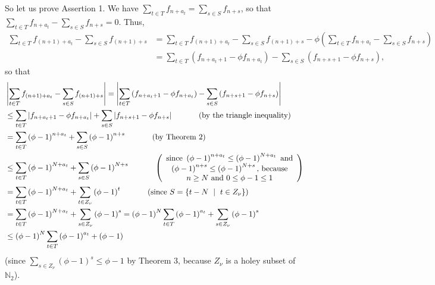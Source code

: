 \documentclass[12pt,final,notitlepage,onecolumn]{article}%
\begin{document}
So let us prove Assertion 1. We have $\sum\limits_{t\in T}f_{n+a_{t}}%
=\sum\limits_{s\in S}f_{n+s}$, so that $\sum\limits_{t\in T}f_{n+a_{t}}%
-\sum\limits_{s\in S}f_{n+s}=0$. Thus,%
\begin{align*}
\sum\limits_{t\in T}f_{\left(  n+1\right)  +a_{t}}-\sum\limits_{s\in
S}f_{\left(  n+1\right)  +s}  &  =\sum\limits_{t\in T}f_{\left(  n+1\right)
+a_{t}}-\sum\limits_{s\in S}f_{\left(  n+1\right)  +s}-\phi\left(
\sum\limits_{t\in T}f_{n+a_{t}}-\sum\limits_{s\in S}f_{n+s}\right) \\
&  =\sum\limits_{t\in T}\left(  f_{n+a_{t}+1}-\phi f_{n+a_{t}}\right)
-\sum\limits_{s\in S}\left(  f_{n+s+1}-\phi f_{n+s}\right)  ,
\end{align*}
so that%
\begin{align}
&  \left\vert \sum\limits_{t\in T}f_{\left(  n+1\right)  +a_{t}}%
-\sum\limits_{s\in S}f_{\left(  n+1\right)  +s}\right\vert =\left\vert
\sum\limits_{t\in T}\left(  f_{n+a_{t}+1}-\phi f_{n+a_{t}}\right)
-\sum\limits_{s\in S}\left(  f_{n+s+1}-\phi f_{n+s}\right)  \right\vert
\nonumber\\
&  \leq\sum\limits_{t\in T}\left\vert f_{n+a_{t}+1}-\phi f_{n+a_{t}%
}\right\vert +\sum\limits_{s\in S}\left\vert f_{n+s+1}-\phi f_{n+s}\right\vert
\ \ \ \ \ \ \ \ \ \ \left(  \text{by the triangle inequality}\right)
\nonumber\\
&  =\sum\limits_{t\in T}\left(  \phi-1\right)  ^{n+a_{t}}+\sum\limits_{s\in
S}\left(  \phi-1\right)  ^{n+s}\ \ \ \ \ \ \ \ \ \ \left(  \text{by Theorem
2}\right) \nonumber\\
&  \leq\sum\limits_{t\in T}\left(  \phi-1\right)  ^{N+a_{t}}+\sum\limits_{s\in
S}\left(  \phi-1\right)  ^{N+s}\ \ \ \ \ \ \ \ \ \ \left(
\begin{array}
[c]{c}%
\text{since }\left(  \phi-1\right)  ^{n+a_{t}}\leq\left(  \phi-1\right)
^{N+a_{t}}\text{ and}\\
\left(  \phi-1\right)  ^{n+s}\leq\left(  \phi-1\right)  ^{N+s}\text{,
because}\\
n\geq N\text{ and }0\leq\phi-1\leq1
\end{array}
\right) \nonumber\\
&  =\sum\limits_{t\in T}\left(  \phi-1\right)  ^{N+a_{t}}+\sum\limits_{t\in
Z_{\nu}}\left(  \phi-1\right)  ^{t}\ \ \ \ \ \ \ \ \ \ \left(  \text{since
}S=\left\{  t-N\ \mid\ t\in Z_{\nu}\right\}  \right) \nonumber\\
&  =\sum\limits_{t\in T}\left(  \phi-1\right)  ^{N+a_{t}}+\sum\limits_{s\in
Z_{\nu}}\left(  \phi-1\right)  ^{s}=\left(  \phi-1\right)  ^{N}\sum
\limits_{t\in T}\left(  \phi-1\right)  ^{a_{t}}+\sum\limits_{s\in Z_{\nu}%
}\left(  \phi-1\right)  ^{s}\nonumber\\
&  \leq\left(  \phi-1\right)  ^{N}\sum\limits_{t\in T}\left(  \phi-1\right)
^{a_{t}}+\left(  \phi-1\right)  \label{Estimate}%
\end{align}
(since $\sum\limits_{s\in Z_{\nu}}\left(  \phi-1\right)  ^{s}\leq\phi-1$ by
Theorem 3, because $Z_{\nu}$ is a holey subset of $\mathbb{N}_{2}$).
\end{document}
